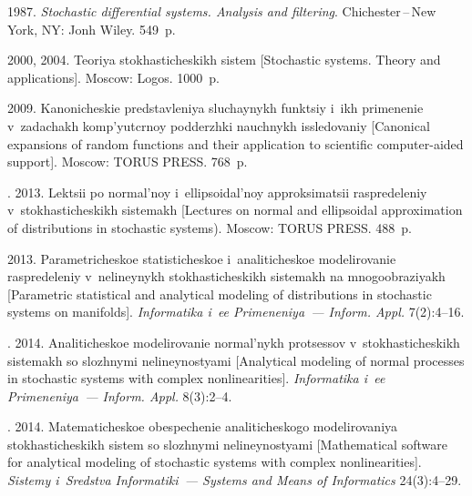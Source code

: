   \begin{multicols}{2}

\renewcommand{\bibname}{\protect\rmfamily References}

{\small\frenchspacing
 {%
 \begin{thebibliography}{9}


1987. \textit{Stochastic differential systems.
Analysis and filtering}. Chichester\,--\,New York, NY: Jonh Wiley.
549~p.


 2000, 2004.
Teoriya stokhasticheskikh sistem [Stochastic systems. Theory and  applications]. 
Moscow: Logos. 1000~p.  %

   2009.    
Kanonicheskie   predstavleniya sluchaynykh  funktsiy i~ikh primenenie 
v~zadachakh komp'yutcrnoy podderzhki nauchnykh issledovaniy 
[Canonical expansions of random functions and their application to scientific 
computer-aided support]. Moscow: TORUS PRESS. 768~p.

. 2013. 
Lektsii po normal'noy i~ellipsoidal'noy approksimatsii raspredeleniy 
v~stokhasticheskikh sistemakh [Lectures on normal and ellipsoidal approximation 
of distributions in stochastic systems). Moscow: TORUS PRESS. 488~p.

  2013.  Parametricheskoe statisticheskoe
i~analiticheskoe   modelirovanie   raspredeleniy   
v~nelineynykh stokhasticheskikh sistemakh na mnogoobraziyakh 
[Parametric statistical and analytical modeling of
distributions in stochastic systems on manifolds]. 
\textit{Informatika i~ee Primeneniya~--- Inform. Appl.} 7(2):4--16.

. 2014. Analiticheskoe
modelirovanie normal'nykh protsessov v~stokhasticheskikh 
sistemakh so slozhnymi nelineynostyami [Analytical
modeling of normal processes in stochastic systems with
complex nonlinearities]. \textit{Informatika i~ee Primeneniya~--- 
Inform. Appl.} 8(3):2--4.

. 2014. Matematicheskoe obespechenie
analiticheskogo modelirovaniya sto\-kha\-sti\-che\-skikh 
sistem so slozhnymi nelineynostyami 
[Mathematical software for analytical modeling of stochastic systems with complex 
nonlinearities]. 
\textit{Sistemy i~Sredstva Informatiki~--- Systems and Means of Informatics} 24(3):4--29.



\end{thebibliography}}}
\end{multicols}
